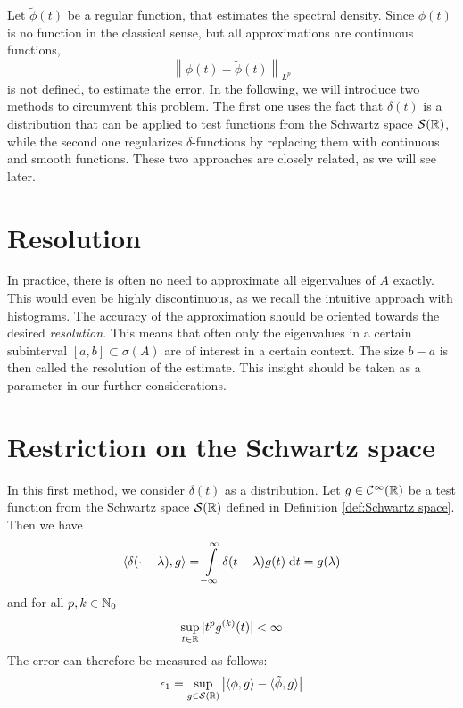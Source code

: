 Let $\tilde{\phi}(t)$ be a regular function, that estimates the spectral density.
Since $\phi(t)$ is no function in the classical sense, but all approximations are continuous functions,
\[
\left \|\phi(t) - \tilde{\phi}(t)\right \|_{L^p}
\]
is not defined, to estimate the error.
In the following, we will introduce two methods to circumvent this problem.
The first one uses the fact that $\delta(t)$ is a distribution that can be applied to test functions from the Schwartz space $\mathcal{S}(\mathbb{R})$,
while the second one regularizes $\delta$-functions by replacing them with continuous and smooth functions.
These two approaches are closely related, as we will see later.

\section{Resolution}
In practice, there is often no need to approximate all eigenvalues of $A$ exactly.
This would even be highly discontinuous, as we recall the intuitive approach with histograms.
The accuracy of the approximation should be oriented towards the desired \emph{resolution}.
This means that often only the eigenvalues in a certain subinterval $[a, b] \subset \sigma(A)$ are of interest in a certain context.
The size $b - a$ is then called the resolution of the estimate.
This insight should be taken as a parameter in our further considerations.

\section{Restriction on the Schwartz space}
In this first method, we consider $\delta(t)$ as a distribution.
Let $g \in \mathcal{C}^{\infty}(\mathbb{R})$ be a test function from the Schwartz space $\mathcal{S}(\mathbb{R})$ defined in Definition \ref{def:Schwartz space}.
Then we have
\[
\langle \delta(\cdot - \lambda), g \rangle = \int\limits_{-\infty}^{\infty} \delta(t - \lambda) g(t) \;\mathrm{d}t = g(\lambda)
\]
and for all $p, k \in \mathbb{N}_0$
\[
\sup_{t \in \mathbb{R}} |t^pg^{(k)}(t)| < \infty
\]
The error can therefore be measured as follows:
\[
\epsilon_1 = \sup_{g \in \mathcal{S}(\mathbb{R})} \left| \langle \phi, g \rangle - \langle \tilde{\phi}, g \rangle \right|
\]

